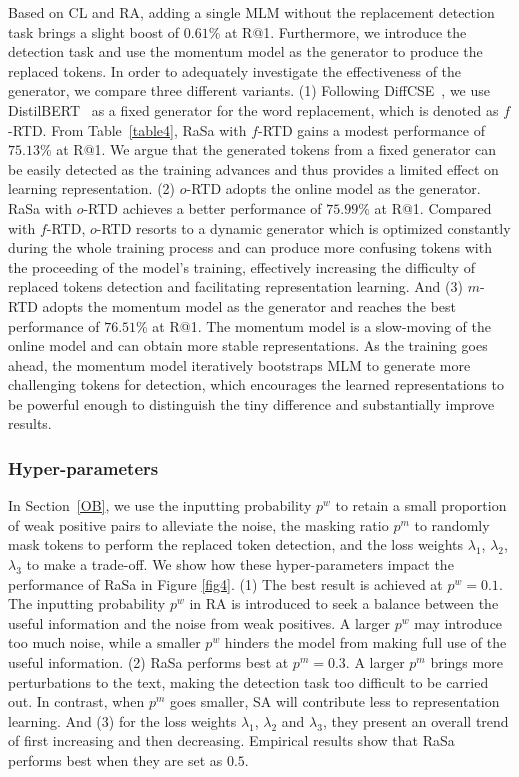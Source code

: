 \documentclass{article}
\begin{document}
Based on CL and RA, adding a single MLM without the replacement detection task brings a slight boost of $0.61$\% at R@1.
Furthermore, we introduce the detection task and use the momentum model as the generator to produce the replaced tokens.
In order to adequately investigate the effectiveness of the generator, we compare three different variants.
(1) Following DiffCSE~\cite{chuang2022diffcse}, we use DistilBERT~\cite{sanh2019distilbert} as a fixed generator for the word replacement, which is denoted as $f$-RTD. 
From Table~\ref{table4}, RaSa with $f$-RTD gains a modest performance of $75.13$\% at R@1. 
We argue that the generated tokens from a fixed generator can be easily detected as the training advances and thus provides a limited effect on learning representation. 
(2) $o$-RTD adopts the online model as the generator. 
RaSa with $o$-RTD achieves a better performance of $75.99\%$ at R@1. 
Compared with $f$-RTD, $o$-RTD resorts to a dynamic generator which is optimized constantly during the whole training process and can produce more confusing tokens with the proceeding of the model's training, effectively increasing the difficulty of replaced tokens detection and facilitating representation learning.
And (3) $m$-RTD adopts the momentum model as the generator and reaches the best performance of $76.51$\% at R@1. The momentum model is a slow-moving of the online model and can obtain more stable representations. 
As the training goes ahead, the momentum model iteratively bootstraps MLM to generate more challenging tokens for detection, which encourages the learned representations to be powerful enough to distinguish the tiny difference and substantially improve results.


\subsubsection{Hyper-parameters}
In Section~\ref{OB}, we use the inputting probability $p^{w}$ to retain a small proportion of weak positive pairs to alleviate the noise, the masking ratio $p^{m}$ to randomly mask tokens to perform the replaced token detection, and the loss weights $\lambda_1$, $\lambda_2$, $\lambda_3$ to make a trade-off. 
We show how these hyper-parameters impact the performance of RaSa in Figure \ref{fig4}.
(1) The best result is achieved at $p^{w}=0.1$. The inputting probability $p^{w}$ in RA is introduced to seek a balance between the useful information and the noise from weak positives. A larger $p^{w}$ may introduce too much noise, while a smaller $p^{w}$ hinders the model from making full use of the useful information. 
(2) RaSa performs best at $p^{m}=0.3$. A larger $p^{m}$ brings more perturbations to the text, making the detection task too difficult to be carried out. In contrast, when $p^{m}$ goes smaller, SA will contribute less to representation learning. 
And (3) for the loss weights $\lambda_1$, $\lambda_2$ and $\lambda_3$, they present an overall trend of first increasing and then decreasing. Empirical results show that RaSa performs best when they are set as $0.5$.
\end{document}
